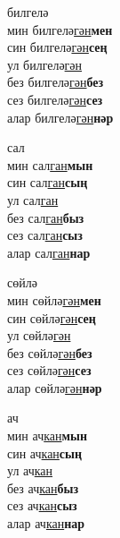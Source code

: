 \begin{multicols}{4}
\begin{enumerate}
\begin{minipage}{\linewidth}
    \item
    билгелә\\
    мин билгелә\underline{гән}\textbf{мен}\\
    син билгелә\underline{гән}\textbf{сең}\\
    ул билгелә\underline{гән}\\
    без билгелә\underline{гән}\textbf{без}\\
    сез билгелә\underline{гән}\textbf{сез}\\
    алар билгелә\underline{гән}\textbf{нәр}\\
\end{minipage}

\begin{minipage}{\linewidth}
    \item
    сал\\
    мин сал\underline{ган}\textbf{мын}\\
    син сал\underline{ган}\textbf{сың}\\
    ул сал\underline{ган}\\
    без сал\underline{ган}\textbf{быз}\\
    сез сал\underline{ган}\textbf{сыз}\\
    алар сал\underline{ган}\textbf{нар}\\
\end{minipage}

\begin{minipage}{\linewidth}
    \item
    сөйлә\\
    мин сөйлә\underline{гән}\textbf{мен}\\
    син сөйлә\underline{гән}\textbf{сең}\\
    ул сөйлә\underline{гән}\\
    без сөйлә\underline{гән}\textbf{без}\\
    сез сөйлә\underline{гән}\textbf{сез}\\
    алар сөйлә\underline{гән}\textbf{нәр}\\
\end{minipage}

\begin{minipage}{\linewidth}
    \item
    ач\\
    мин ач\underline{кан}\textbf{мын}\\
    син ач\underline{кан}\textbf{сың}\\
    ул ач\underline{кан}\\
    без ач\underline{кан}\textbf{быз}\\
    сез ач\underline{кан}\textbf{сыз}\\
    алар ач\underline{кан}\textbf{нар}\\
\end{minipage}


\end{enumerate}
\end{multicols}
